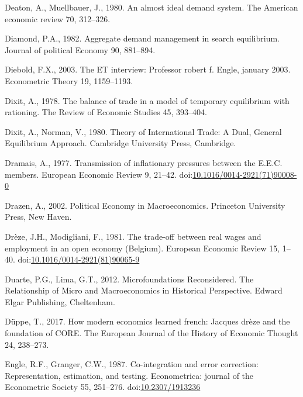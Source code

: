 \documentclass[
  12pt,
  onecolumn]{article}
\newlength{\cslhangindent}
\newlength{\cslentryspacingunit} %
\newenvironment{CSLReferences}[2] %
 {%
  \setlength{\parindent}{0pt}
  \ifodd #1
  \let\oldpar\par
  \def\par{\hangindent=\cslhangindent\oldpar}
  \fi
  \setlength{\parskip}{#2\cslentryspacingunit}
 }%
 {}
\begin{document}
\begin{CSLReferences}{1}{0}
\leavevmode{}%
Deaton, A., Muellbauer, J., 1980. An almost ideal demand system. The American economic review 70, 312--326.

\leavevmode{}%
Diamond, P.A., 1982. Aggregate demand management in search equilibrium. Journal of political Economy 90, 881--894.

\leavevmode{}%
Diebold, F.X., 2003. The {ET} interview: {Professor} robert f. Engle, january 2003. Econometric Theory 19, 1159--1193.

\leavevmode{}%
Dixit, A., 1978. The balance of trade in a model of temporary equilibrium with rationing. The Review of Economic Studies 45, 393--404.

\leavevmode{}%
Dixit, A., Norman, V., 1980. Theory of {International Trade}: {A Dual}, {General Equilibrium Approach}. {Cambridge University Press}, Cambridge.

\leavevmode{}%
Dramais, A., 1977. Transmission of inflationary pressures between the {E}.{E}.{C}. members. European Economic Review 9, 21--42. doi:\href{https://doi.org/10.1016/0014-2921(71)90008-0}{10.1016/0014-2921(71)90008-0}

\leavevmode{}%
Drazen, A., 2002. Political {Economy} in {Macroeconomics}. {Princeton University Press}, {New Haven}.

\leavevmode{}%
Drèze, J.H., Modigliani, F., 1981. The trade-off between real wages and employment in an open economy ({Belgium}). European Economic Review 15, 1--40. doi:\href{https://doi.org/10.1016/0014-2921(81)90065-9}{10.1016/0014-2921(81)90065-9}

\leavevmode{}%
Duarte, P.G., Lima, G.T., 2012. Microfoundations {Reconsidered}. {The Relationship} of {Micro} and {Macroeconomics} in {Historical Perspective}. {Edward Elgar Publishing}, {Cheltenham}.

\leavevmode{}%
Düppe, T., 2017. How modern economics learned french: Jacques drèze and the foundation of CORE. The European Journal of the History of Economic Thought 24, 238--273.

\leavevmode{}%
Engle, R.F., Granger, C.W., 1987. Co-integration and error correction: Representation, estimation, and testing. Econometrica: journal of the Econometric Society 55, 251--276. doi:\href{https://doi.org/10.2307/1913236}{10.2307/1913236}


\end{CSLReferences}
\end{document}
